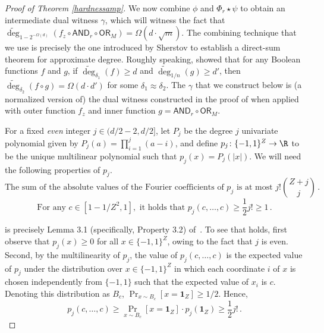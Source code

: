 \documentclass{toc}
\newcommand{\OR}{\mathsf{ OR}}
\newcommand{\bits}{\{-1,1\}}
\newcommand{\ls}{\star}
\newcommand{\adeg}{\widetilde{\operatorname{deg}}}
\newcommand{\AND}{\mathsf{AND}}
\begin{document}
\begin{proof}[Proof of Theorem \ref{hardnessamp}]
	We now combine $\phi$ and $\Phi_r \ls \psi$ to obtain an intermediate dual witness $\gamma$, 
	which will witness the fact that $\adeg_{1-2^{-\Omega(d)}}(f_z \circ \AND_r \circ \OR_M) = \Omega(d \cdot \sqrt{m})$.
	The combining technique that we use is precisely the one introduced by Sherstov \cite[Theorem 6.1]{sherstovdp} 
	to establish a direct-sum theorem for approximate degree. Roughly speaking, \cite[Theorem 6.1]{sherstovdp}
	showed that for any Boolean functions $f$ and $g$, if $\adeg_{\delta_1}(f) \geq d$ and $\adeg_{1/n}(g) \geq d'$, then $\adeg_{\delta_2}(f \circ g) = \Omega(d \cdot d')$
	for some $\delta_1 \approx \delta_2$. The $\gamma$ that we construct below is 
	(a normalized version of) the dual witness constructed in the proof of \cite[Theorem 6.1]{sherstovdp} when
	applied with outer function $f_z$ and inner function $g=\AND_r \circ \OR_M$. 
	
	For a fixed \emph{even} integer $j \in (d/2-2, d/2]$, let $P_j$ be the degree $j$ univariate polynomial given by $P_j(a) = \prod_{i=1}^j (a-i)$,
	and define $p_j \colon \bits^{Z} \to \R$ to
	be the unique multilinear polynomial such that $p_j(x)= P_j(|x|)$. 
	We will need the following properties of $p_j$.
	\begin{equation}
	\label{fourierpj} 
	\text{The sum of the absolute values of the Fourier coefficients of } p_j \text{ is at most } j! {Z + j \choose j}\,.
	\end{equation}
	\begin{equation} \label{pjeq}
	\text{For any } c \in [1-1/Z^2, 1], \text{ it holds that } p_j(c, \dots, c) \geq \frac{1}{2}  j! \geq 1\,.
	\end{equation}
	
	 is precisely Lemma 3.1 (specifically, Property 3.2) of~\cite{sherstovdp}.
	To see that  holds, first observe that $p_j(x) \geq 0$ for all $x \in \bits^{Z}$,
	owing to the fact that $j$ is even. Second, by the multilinearity of $p_j$, the value of $p_j(c, \dots, c)$ is the expected
	value of $p_j$ under the distribution over $x \in \bits^{Z}$ in which each coordinate $i$ of $x$ is chosen independently
	from $\{-1, 1\}$ such that the expected value of $x_i$ is $c$. Denoting this distribution as $B_c$, $\Pr_{x \sim B_c}[x = \mathbf{1}_{Z}] \geq 1/2$.
Hence, %
\begin{equation}
 p_j(c, \dots, c) \geq \Pr_{x \sim B_c}[x = \mathbf{1}_{Z}] \cdot p_j(\mathbf{1}_{Z}) \geq \frac12  j!\,.
\end{equation}	
	\medskip
	 

\end{proof}
\end{document}
